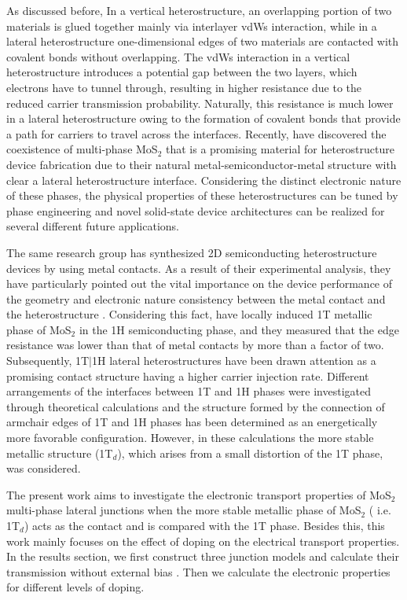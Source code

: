 As discussed before, In a vertical heterostructure, an overlapping portion of two materials is glued together mainly via interlayer vdWs interaction, while in a lateral heterostructure one-dimensional edges of two materials are contacted with covalent bonds without overlapping. The vdWs interaction in a vertical heterostructure introduces a potential gap between the two layers, which electrons have to tunnel through, resulting in higher resistance due to the reduced carrier transmission probability. Naturally, this resistance is much lower in a lateral heterostructure owing to the formation of covalent bonds that provide a path for carriers to travel across the interfaces\cite{Matsuda2010,Kang2014}. Recently, \citet{Eda2012} have discovered the coexistence of multi-phase MoS$_2$ that is a promising material for heterostructure device fabrication due to their natural metal-semiconductor-metal structure with clear a lateral heterostructure interface\cite{Eda2012}. Considering the distinct electronic nature of these phases, the physical properties of these heterostructures\cite{Kappera2014,Fan2015} can be tuned by phase engineering and novel solid-state device architectures can be realized for several different future applications.

The same research group has synthesized 2D semiconducting heterostructure devices\cite{Huang2014,Zhang2015} by using metal contacts. As a result of their experimental analysis, they have particularly pointed out the vital importance on the device performance of the geometry and electronic nature consistency between the metal contact and the heterostructure \cite{Bai2013,Eda2012}. Considering this fact, \citet{Kappera2014} have locally induced 1T metallic phase of MoS$_2$ in the 1H semiconducting phase, and they measured that the edge resistance was lower than that of metal contacts by more than a factor of two. Subsequently, 1T$\mid$1H lateral heterostructures have been drawn attention as a promising contact structure having a higher carrier injection rate. Different arrangements of the interfaces between 1T and 1H phases were investigated through theoretical calculations\cite{Hu2015,Sivaraman2016} and the structure formed by the connection of armchair edges of 1T and 1H phases has been determined as an energetically more favorable configuration. However, in these calculations the more stable metallic structure (1T$_d$), which arises from a small distortion of the 1T phase, was considered.

The present work aims to investigate the electronic transport properties of MoS$_2$ multi-phase lateral junctions when the more stable metallic phase of MoS$_2$ ( i.e. 1T$_d$) acts as the contact and is compared with the 1T phase. Besides this, this work mainly focuses on the effect of doping on the electrical transport properties. In the results section, we first construct three junction models and calculate their transmission without external bias . Then we calculate the electronic properties for different levels of doping.



